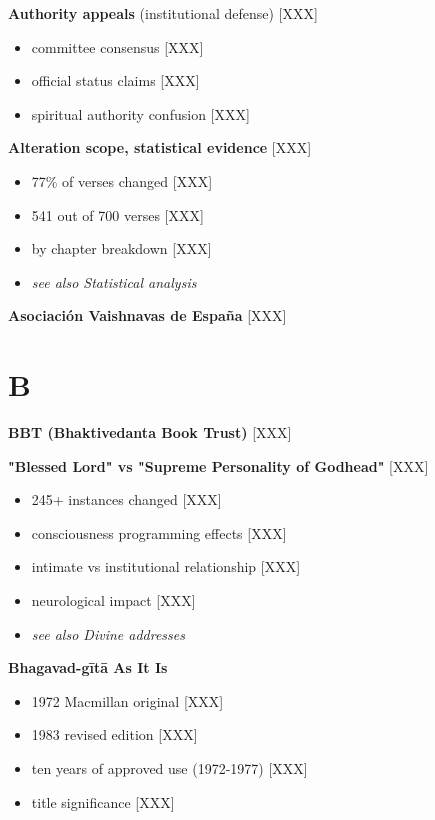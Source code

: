 \documentclass[11pt,twoside]{book}
\begin{document}
\textbf{\textbf{Authority appeals}} (institutional defense) [XXX]
\begin{itemize}
\item committee consensus [XXX]
\item official status claims [XXX]
\item spiritual authority confusion [XXX]
\end{itemize}

\textbf{\textbf{Alteration scope, statistical evidence}} {[}XXX]
\begin{itemize}
\item 77\% of verses changed [XXX]
\item 541 out of 700 verses [XXX]
\item by chapter breakdown [XXX]
\item \emph{see also Statistical analysis}
\end{itemize}

\textbf{\textbf{Asociación Vaishnavas de España}} {[}XXX]
\section*{B}
\label{sec:orgae3fad9}

\textbf{\textbf{BBT (Bhaktivedanta Book Trust)}} {[}XXX]

\textbf{\textbf{"Blessed Lord" vs "Supreme Personality of Godhead"}} {[}XXX]
\begin{itemize}
\item 245+ instances changed [XXX]
\item consciousness programming effects [XXX]
\item intimate vs institutional relationship [XXX]
\item neurological impact [XXX]
\item \emph{see also Divine addresses}
\end{itemize}

\textbf{\textbf{Bhagavad-gītā As It Is}}
\begin{itemize}
\item 1972 Macmillan original [XXX]
\item 1983 revised edition [XXX]
\item ten years of approved use (1972-1977) [XXX]
\item title significance [XXX]
\end{itemize}
\end{document}
